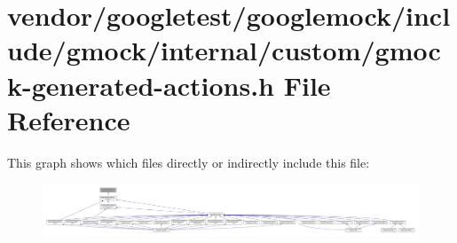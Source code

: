 \hypertarget{internal_2custom_2gmock-generated-actions_8h}{}\section{vendor/googletest/googlemock/include/gmock/internal/custom/gmock-\/generated-\/actions.h File Reference}
\label{internal_2custom_2gmock-generated-actions_8h}
This graph shows which files directly or indirectly include this file\+:
\nopagebreak
\begin{figure}[H]
\begin{center}
\leavevmode
\includegraphics[width=350pt]{internal_2custom_2gmock-generated-actions_8h__dep__incl}
\end{center}
\end{figure}
